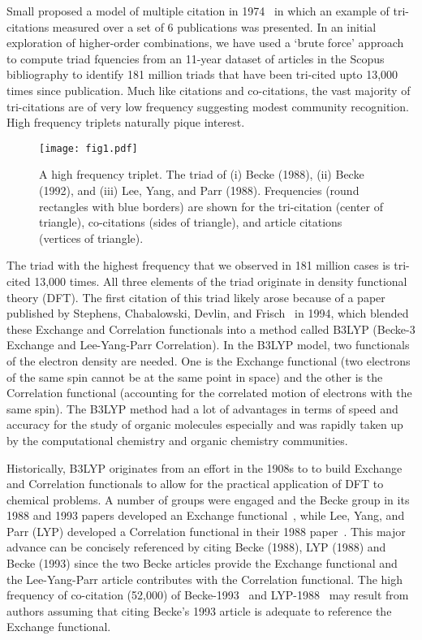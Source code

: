 \documentclass[notitlepage]{report}
\begin{document}
Small proposed a model of multiple citation in 1974~\citep{small1974multiple} in which an example of tri-citations measured over a set of 6 publications was presented. In an initial exploration of higher-order combinations, we have used a `brute force' approach to compute triad fquencies from an 11-year dataset of articles in the Scopus bibliography to identify 181 million triads that have been tri-cited upto 13,000 times since publication. Much like citations and co-citations, the vast majority of tri-citations are of very low frequency suggesting modest community recognition. High frequency triplets naturally pique interest. 

\begin{figure}[h!]
\begin{center}
\texttt{[image: fig1.pdf]}%
\end{center}
\caption{A high frequency triplet. The triad of (i) Becke (1988), (ii) Becke (1992), and (iii) Lee, Yang, and Parr (1988).  Frequencies (round rectangles with blue borders) are shown for the tri-citation (center of triangle), co-citations (sides of triangle), and 
article citations (vertices of triangle). 
}
\label{fig:fig1}
\end{figure}
The triad with the highest frequency that we observed in 181 million cases is tri-cited 13,000 times.  All three elements of the triad originate in density functional theory (DFT). The first citation of this triad likely arose because of a paper published by Stephens, Chabalowski, Devlin, and Frisch~\citep{stephens1994ab} in 1994, which blended these Exchange and Correlation functionals into a method called B3LYP (Becke-3 Exchange and Lee-Yang-Parr Correlation). In the B3LYP model, two functionals of the electron density are needed. One is the Exchange functional (two electrons of the same spin cannot be at the same point in space) and the other is the Correlation functional (accounting for the correlated motion of electrons with the same spin). The B3LYP method had a lot of advantages in terms of speed and accuracy for the study of organic molecules especially and was rapidly taken up by the computational chemistry and organic chemistry communities.

Historically, B3LYP originates from an effort in the 1908s to to build Exchange and Correlation functionals to allow for the practical application of DFT to chemical problems. A number of groups were engaged and the Becke group in its 1988 and 1993 papers developed an Exchange functional~\citep{becke1988density,becke1993dft}, while Lee, Yang, and Parr (LYP) developed a Correlation functional in their 1988 paper~\citep{lyp1988}. This major advance can be concisely referenced by citing Becke (1988), LYP (1988) and Becke (1993) since the two Becke articles provide the Exchange functional and the Lee-Yang-Parr article contributes with the Correlation functional. The high frequency of co-citation (52,000) of Becke-1993~\citep{becke1993dft} and LYP-1988~\citep{lyp1988} may result from authors assuming that citing Becke's 1993 article is adequate to reference the Exchange functional. 
\end{document}
